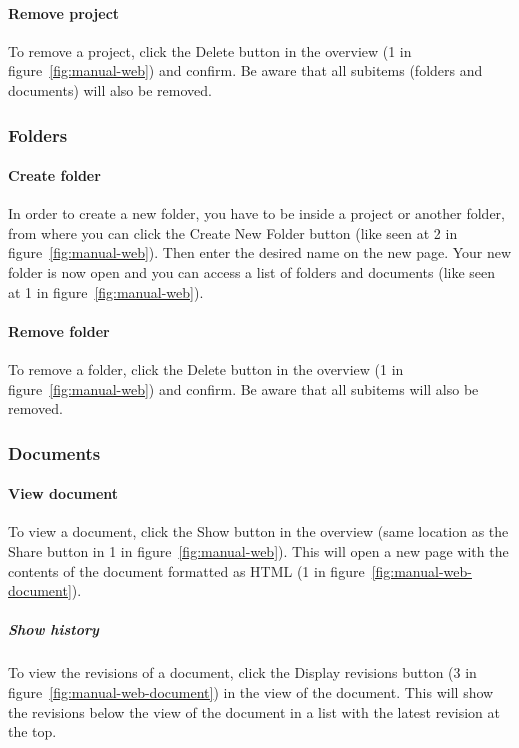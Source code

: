 	\paragraph{Remove project}
	To remove a project, click the Delete button in the overview (1 in figure~\ref{fig:manual-web}) and confirm. Be aware that all subitems (folders and documents) will also be removed.

\subsubsection{Folders}

	\paragraph{Create folder}
	In order to create a new folder, you have to be inside a project or another folder, from where you can click the Create New Folder button (like seen at 2 in figure~\ref{fig:manual-web}). Then enter the desired name on the new page. Your new folder is now open and you can access a list of folders and documents (like seen at 1 in figure~\ref{fig:manual-web}).

	\paragraph{Remove folder}
	To remove a folder, click the Delete button in the overview (1 in figure~\ref{fig:manual-web}) and confirm. Be aware that all subitems will also be removed.

\subsubsection{Documents}

	\paragraph{View document}
	To view a document, click the Show button in the overview (same location as the Share button in 1 in figure~\ref{fig:manual-web}). This will open a new page with the contents of the document formatted as HTML (1 in figure~\ref{fig:manual-web-document}).
		
		\subparagraph{Show history}
		To view the revisions of a document, click the Display revisions button (3 in figure~\ref{fig:manual-web-document}) in the view of the document. This will show the revisions below the view of the document in a list with the latest revision at the top.

